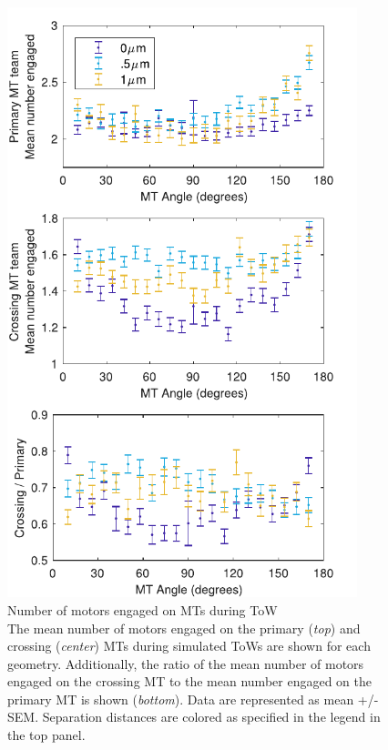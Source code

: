 \begin{figure}
\centering
\includegraphics[width=4in]{appendix2/num_engagedEXP.pdf}
\caption[Number of motors engaged on MTs during ToW]{ Number of motors engaged on MTs during ToW\\
The mean number of motors engaged on the primary (\textit{top}) and crossing (\textit{center}) MTs during simulated ToWs are shown for each geometry. Additionally, the ratio of the mean number of motors engaged on the crossing MT to the mean number engaged on the primary MT is shown (\textit{bottom}). Data are represented as mean +/- SEM. Separation distances are colored as specified in the legend in the top panel.
} \label{fig:num_engagedEXP}
\end{figure}

\clearpage